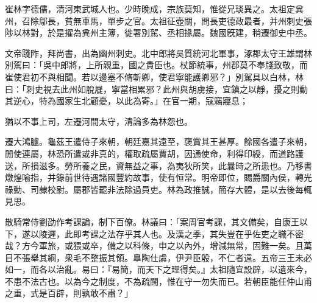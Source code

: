 \begin{pinyinscope}
 
 
 崔林字德儒，清河東武城人也。少時晚成，宗族莫知，惟從兄琰異之。太祖定兾州，召除鄔長，貧無車馬，單步之官。太祖征壺關，問長吏德政最者，并州刺史張陟以林對，於是擢為兾州主簿，徙署別駕、丞相掾屬。魏國旣建，稍遷御史中丞。
 
 
 
 
 文帝踐阼，拜尚書，出為幽州刺史。北中郎將吳質統河北軍事，涿郡太守王雄謂林別駕曰：「吳中郎將，上所親重，國之貴臣也。杖節統事，州郡莫不奉牋致敬，而崔使君初不與相聞。若以邊塞不脩斬卿，使君寧能護卿邪？」別駕具以白林，林曰：「刺史視去此州如脫屣，寧當相累邪？此州與胡虜接，宜鎮之以靜，擾之則動其逆心，特為國家生北顧憂，以此為寄。」在官一期，寇竊寢息；
 
 
 猶以不事上司，左遷河間太守，清論多為林怨也。
 
 
 
 
 遷大鴻臚。龜茲王遣侍子來朝，朝廷嘉其遠至，襃賞其王甚厚。餘國各遣子來朝，閒使連屬，林恐所遣或非真的，權取疏屬賈胡，因通使命，利得印綬，而道路護送，所損滋多。勞所養之民，資無益之事，為夷狄所笑，此曩時之所患也。乃移書燉煌喻指，并錄前世待遇諸國豐約故事，使有恒常。明帝即位，賜爵關內侯，轉光祿勳、司隷校尉。屬郡皆罷非法除過員吏。林為政推誠，簡存大體，是以去後每輒見思。
 
 
 
 
 散騎常侍劉劭作考課論，制下百僚。林議曰：「案周官考課，其文備矣，自康王以下，遂以陵遲，此即考課之法存乎其人也。及漢之季，其失豈在乎佐吏之職不密哉？方今軍旅，或猥或卒，備之以科條，申之以內外，增減無常，固難一矣。且萬目不張舉其綱，衆毛不整振其領。臯陶仕虞，伊尹臣殷，不仁者遠。五帝三王未必如一，而各以治亂。易曰：『易簡，而天下之理得矣。』太祖隨宜設辟，以遺來今，不患不法古也。以為今之制度，不為疏闊，惟在守一勿失而已。若朝臣能任仲山甫之重，式是百辟，則孰敢不肅？」
 

\end{pinyinscope}
